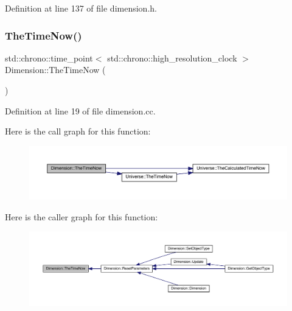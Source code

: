 Definition at line 137 of file dimension.\+h.

\mbox{\label{class_dimension_ab39b7ff253ade59c5c2d807c511b4028}} 
\subsubsection{\texorpdfstring{The\+Time\+Now()}{TheTimeNow()}}
{\footnotesize\ttfamily std\+::chrono\+::time\+\_\+point$<$ std\+::chrono\+::high\+\_\+resolution\+\_\+clock $>$ Dimension\+::\+The\+Time\+Now (\begin{DoxyParamCaption}{ }\end{DoxyParamCaption})}



Definition at line 19 of file dimension.\+cc.

Here is the call graph for this function\+:
\nopagebreak
\begin{figure}[H]
\begin{center}
\leavevmode
\includegraphics[width=350pt]{class_dimension_ab39b7ff253ade59c5c2d807c511b4028_cgraph}
\end{center}
\end{figure}
Here is the caller graph for this function\+:
\nopagebreak
\begin{figure}[H]
\begin{center}
\leavevmode
\includegraphics[width=350pt]{class_dimension_ab39b7ff253ade59c5c2d807c511b4028_icgraph}
\end{center}
\end{figure}
\mbox{\label{class_dimension_a663916c2573b6df4db02ccee5678a75d}} 
